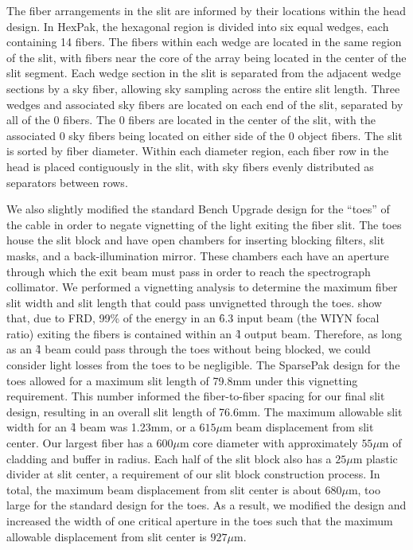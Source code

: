 The fiber arrangements in the slit are informed by their locations within the
head design.  In HexPak, the hexagonal region is divided into six equal
wedges, each containing 14 fibers.  The fibers within each wedge are located
in the same region of the slit, with fibers near the core of the array being
located in the center of the slit segment.  Each wedge section in the slit is
separated from the adjacent wedge sections by a sky fiber, allowing sky
sampling across the entire slit length.  Three wedges and associated sky
fibers are located on each end of the slit, separated by all of the 0
fibers.  The 0 fibers are located in the center of the slit, with the
associated 0 sky fibers being located on either side of the
0 object fibers.  The \GP slit is sorted by fiber diameter.
Within each diameter region, each fiber row in the head is placed contiguously
in the slit, with sky fibers evenly distributed as separators between rows.


We also slightly modified the standard Bench Upgrade design for the ``toes''
of the cable in order to negate vignetting of the light exiting the fiber
slit.  The toes house the slit block and have open chambers for inserting
blocking filters, slit masks, and a back-illumination mirror.  These chambers
each have an aperture through which the exit beam must pass in order to reach
the spectrograph collimator.  We performed a vignetting analysis to determine
the maximum fiber slit width and slit length that could pass unvignetted
through the toes. \citet{Bershady04} show that, due to FRD, 99\% of
the energy in an \f6.3 input beam (the WIYN focal ratio) exiting the fibers is
contained within an \f4 output beam.  Therefore, as long as an \f4 beam could
pass through the toes without being blocked, we could consider light losses
from the toes to be negligible.  The SparsePak design for the toes allowed for
a maximum slit length of 79.8mm under this vignetting requirement.  This
number informed the fiber-to-fiber spacing for our final slit design,
resulting in an overall slit length of 76.6mm.  The maximum allowable slit
width for an \f4 beam was 1.23mm, or a $615\mu$m beam displacement from slit
center.  Our largest fiber has a $600\mu$m core diameter with approximately
$55\mu$m of cladding and buffer in radius.  Each half of the slit block also
has a $25\mu$m plastic divider at slit center, a requirement of our slit block
construction process.  In total, the maximum beam displacement from slit
center is about $680\mu$m, too large for the standard design for the toes.  As
a result, we modified the design and increased the width of one critical
aperture in the toes such that the maximum allowable displacement from slit
center is $927\mu$m.


